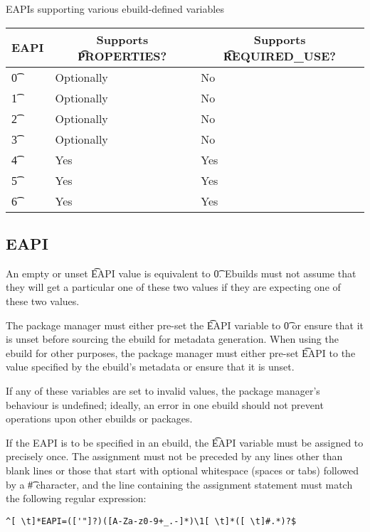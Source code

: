 \begin{centertable}{EAPIs supporting various ebuild-defined variables}
\label{tab:optional-vars-table}
    \begin{tabular}{ l l l }
        \toprule
        \multicolumn{1}{c}{\textbf{EAPI}} &
        \multicolumn{1}{c}{\textbf{Supports \t{PROPERTIES}?}} &
        \multicolumn{1}{c}{\textbf{Supports \t{REQUIRED\_USE}?}} \\
        \midrule
    \t{0} & Optionally & No \\
    \t{1} & Optionally & No \\
    \t{2} & Optionally & No \\
    \t{3} & Optionally & No \\
    \t{4} & Yes & Yes \\
    \t{5} & Yes & Yes \\
    \t{6} & Yes & Yes \\
    \bottomrule
    \end{tabular}
\end{centertable}

\subsection{EAPI}
\label{sec:pre-source-eapi}

An empty or unset \t{EAPI} value is equivalent to \t{0}. Ebuilds must not assume that they will get
a particular one of these two values if they are expecting one of these two values.

The package manager must either pre-set the \t{EAPI} variable to \t{0} or ensure that it is unset
before sourcing the ebuild for metadata generation. When using the ebuild for other purposes, the
package manager must either pre-set \t{EAPI} to the value specified by the ebuild's metadata or
ensure that it is unset.

If any of these variables are set to invalid values, the package manager's behaviour is undefined;
ideally, an error in one ebuild should not prevent operations upon other ebuilds or packages.

If the EAPI is to be specified in an ebuild, the \t{EAPI} variable must be assigned to precisely
once. The assignment must not be preceded by any lines other than blank lines or those that start
with optional whitespace (spaces or tabs) followed by a \t{\#} character, and the line containing
the assignment statement must match the following regular expression:
\begin{verbatim}
^[ \t]*EAPI=(['"]?)([A-Za-z0-9+_.-]*)\1[ \t]*([ \t]#.*)?$
\end{verbatim}

